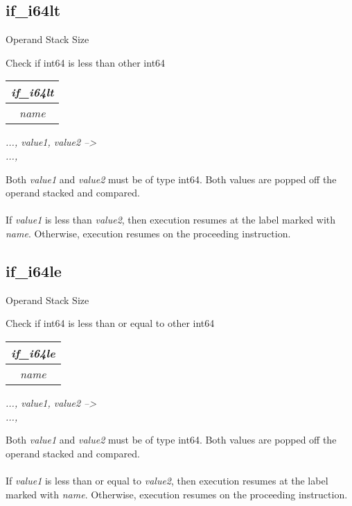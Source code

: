 \documentclass[12pt]{article}
\begin{document}
		\subsection*{if\_i64lt}
			\begin{labeling}{Operand Stack Size}
				\item [\textbf{Operation}] Check if int64 is less than other int64
				\item [\textbf{Format}] \begin{tabular}{| c |} \hline \textit{if\_i64lt} \\ \hline \textit{name} \\ \hline \end{tabular}
				\item [\textbf{Operand Stack}] \textit{..., value1, value2 --\textgreater} \\
										\textit{..., }
				\item [\textbf{Description}] Both \textit{value1} and \textit{value2} must be of type int64. Both values are popped off the operand stacked and compared. \\ \\
				If \textit{value1} is less than \textit{value2}, then execution resumes at the label marked with \textit{name}. Otherwise, execution resumes on the proceeding instruction. 
			\end{labeling}	
		\newpage
		
		\subsection*{if\_i64le}
			\begin{labeling}{Operand Stack Size}
				\item [\textbf{Operation}] Check if int64 is less than or equal to other int64
				\item [\textbf{Format}] \begin{tabular}{| c |} \hline \textit{if\_i64le} \\ \hline \textit{name} \\ \hline \end{tabular}
				\item [\textbf{Operand Stack}] \textit{..., value1, value2 --\textgreater} \\
										\textit{..., }
				\item [\textbf{Description}] Both \textit{value1} and \textit{value2} must be of type int64. Both values are popped off the operand stacked and compared. \\ \\
				If \textit{value1} is less than or equal to \textit{value2}, then execution resumes at the label marked with \textit{name}. Otherwise, execution resumes on the proceeding instruction. 
			\end{labeling}	
		\newpage
\end{document}
